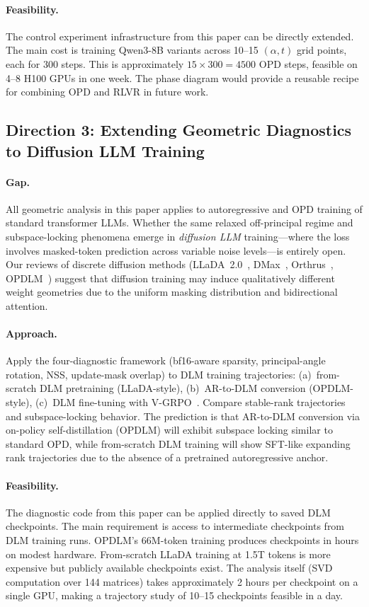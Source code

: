 \documentclass[11pt,a4paper]{article}
\begin{document}
\paragraph{Feasibility.} The control experiment infrastructure from this paper can be directly extended. The main cost is training Qwen3-8B variants across 10--15 $(\alpha, t)$ grid points, each for 300 steps. This is approximately $15 \times 300 = 4500$ OPD steps, feasible on 4--8 H100 GPUs in one week. The phase diagram would provide a reusable recipe for combining OPD and RLVR in future work.

\subsection{Direction 3: Extending Geometric Diagnostics to Diffusion LLM Training}

\paragraph{Gap.} All geometric analysis in this paper applies to autoregressive and OPD training of standard transformer LLMs. Whether the same relaxed off-principal regime and subspace-locking phenomena emerge in \emph{diffusion LLM} training---where the loss involves masked-token prediction across variable noise levels---is entirely open. Our reviews of discrete diffusion methods (LLaDA~2.0~\cite{nie2026llada2}, DMax~\cite{chen2026dmax}, Orthrus~\cite{kim2026orthrus}, OPDLM~\cite{su2026opdlm}) suggest that diffusion training may induce qualitatively different weight geometries due to the uniform masking distribution and bidirectional attention.

\paragraph{Approach.} Apply the four-diagnostic framework (bf16-aware sparsity, principal-angle rotation, NSS, update-mask overlap) to DLM training trajectories: (a)~from-scratch DLM pretraining (LLaDA-style), (b)~AR-to-DLM conversion (OPDLM-style), (c)~DLM fine-tuning with V-GRPO~\cite{li2026vgrpo}. Compare stable-rank trajectories and subspace-locking behavior. The prediction is that AR-to-DLM conversion via on-policy self-distillation (OPDLM) will exhibit subspace locking similar to standard OPD, while from-scratch DLM training will show SFT-like expanding rank trajectories due to the absence of a pretrained autoregressive anchor.

\paragraph{Feasibility.} The diagnostic code from this paper can be applied directly to saved DLM checkpoints. The main requirement is access to intermediate checkpoints from DLM training runs. OPDLM's 66M-token training produces checkpoints in hours on modest hardware. From-scratch LLaDA training at 1.5T tokens is more expensive but publicly available checkpoints exist. The analysis itself (SVD computation over 144 matrices) takes approximately 2 hours per checkpoint on a single GPU, making a trajectory study of 10--15 checkpoints feasible in a day.
\end{document}

